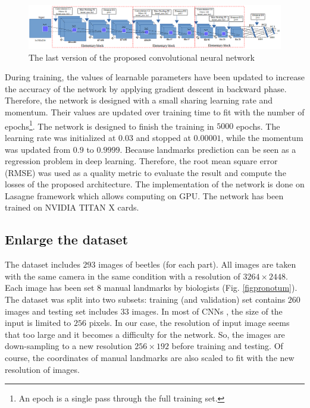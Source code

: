 \documentclass[10pt]{article}
\begin{document}
\begin{figure}[!t]
\centering
\includegraphics[scale=0.45]{images/arch_model}
\caption{The last version of the proposed convolutional neural network} 
\label{cnnnetwork2}
\end{figure}

During training, the values of learnable parameters have been updated to increase the accuracy of the network by applying gradient descent in backward phase. Therefore, the network is designed with a small sharing learning rate and momentum. Their values are updated over training time to fit with the number of epochs\footnote{An epoch is a single pass through the full training set.}. The network is designed to finish the training in $5000$ epochs. The learning rate was initialized at $0.03$ and stopped at $0.00001$, while the momentum was updated from $0.9$ to $0.9999$. 
Because landmarks prediction can be seen as a regression problem in deep learning. Therefore, the root mean square error (RMSE) was used as a quality metric to evaluate the result and compute the losses of the proposed architecture. The implementation of the network is done on Lasagne framework \cite{lasagne} which allows computing on GPU. The network has been trained on NVIDIA TITAN X cards.

\subsection{Enlarge the dataset}
\label{sec_data}
The dataset includes $293$ images of beetles (for each part). All images are taken with the same camera in the same condition with a resolution of $3264 \times 2448$. Each image has been set $8$ manual landmarks by biologists (Fig. \ref{figpronotum}). The dataset was split into two subsets: training (and validation) set contains $260$ images and testing set includes $33$ images. In most of CNNs \cite{lecun2010convolutional, sun2013deep,  krizhevsky2012imagenet, cintas2016automatic}, the size of the input is limited to $256$ pixels. In our case, the resolution of input image seems that too large and it becomes a difficulty for the network. So, the images are down-sampling to a new resolution $256 \times 192$ before training and testing. Of course, the coordinates of manual landmarks are also scaled to fit with the new resolution of images.
\end{document}
